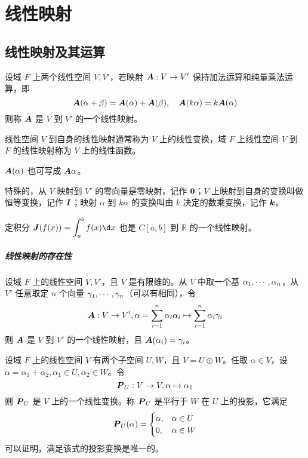 \chapter{线性映射}

\section{线性映射及其运算}

\begin{definition}[线性映射]
	设域 $F$ 上两个线性空间 $V,V'$，若映射 $\boldsymbol{A} : V \to V'$ 保持加法运算和纯量乘法运算，即
	\[ \boldsymbol{A}(\alpha + \beta) = \boldsymbol{A}(\alpha) + \boldsymbol{A}(\beta), \quad \boldsymbol{A}(k\alpha) = k \boldsymbol{A}(\alpha) \]
	则称 $\boldsymbol{A}$ 是 $V$ 到 $V'$ 的一个线性映射。
\end{definition}

线性空间 $V$ 到自身的线性映射通常称为 $V$ 上的线性变换，域 $F$ 上线性空间 $V$ 到 $F$ 的线性映射称为 $V$ 上的线性函数。

$\boldsymbol{A}(\alpha)$ 也可写成 $\boldsymbol{A}\alpha$。

特殊的，从 $V$ 映射到 $V'$ 的零向量是零映射，记作 $\boldsymbol{0}$；$V$ 上映射到自身的变换叫做恒等变换，记作 $\boldsymbol{I}$；映射 $\alpha$ 到 $k\alpha$ 的变换叫由 $k$ 决定的数乘变换，记作 $\boldsymbol{k}$。

定积分 $\displaystyle \vbf{J}(f(x)) = \int_a^b f(x) \d x$ 也是 $C[a,b]$ 到 $\mathbb{R}$ 的一个线性映射。

\paragraph{线性映射的存在性}

\begin{theorem}
	设域 $F$ 上的线性空间 $V,V'$，且 $V$ 是有限维的。从 $V$ 中取一个基 $\alpha_1,\cdots,\alpha_n$，从 $V'$ 任意取定 $n$ 个向量 $\gamma_1,\cdots,\gamma_n$（可以有相同），令
	\[ \boldsymbol{A} : V \to V', \alpha = \sum_{i=1}^n \alpha_i\alpha_i \mapsto \sum_{i=1}^n \alpha_i\gamma_i \]
	则 $\boldsymbol{A}$ 是 $V$ 到 $V'$ 的一个线性映射，且 $\boldsymbol{A}(\alpha_i) = \gamma_i$。
\end{theorem}

设域 $F$ 上的线性空间 $V$ 有两个子空间 $U,W$，且 $V = U \oplus W$。任取 $\alpha \in V$，设 $\alpha = \alpha_1 + \alpha_2, \alpha_1 \in U, \alpha_2\in W$。令
\[ \boldsymbol{P}_U : V \to V, \alpha \mapsto \alpha_1 \]
则 $\boldsymbol{P}_U$ 是 $V$ 上的一个线性变换。称 $\boldsymbol{P}_U$ 是平行于 $W$ 在 $U$ 上的投影，它满足
\[ \boldsymbol{P}_U(\alpha) =
	\begin{cases}
		\alpha, & \alpha \in U  \\
		0 ,	 & \alpha \in W
	\end{cases} \]
可以证明，满足该式的投影变换是唯一的。


